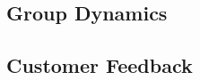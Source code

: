 \documentclass[11pt]{report}
\begin{document}
\subsection{Group Dynamics}

\subsection{Customer Feedback}


\begin{minipage}{\linewidth}


\end{minipage}
\end{document}
